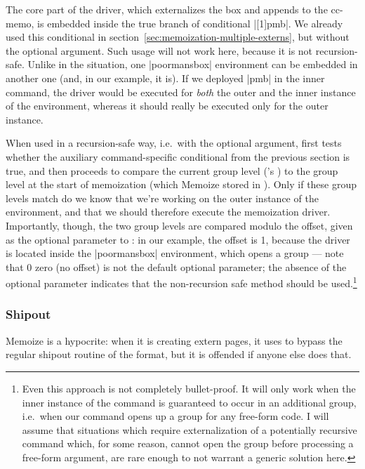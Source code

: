 \documentclass[a4paper,11pt]{article}
\begin{document}
The core part of the driver, which externalizes the box and appends to the
cc-memo, is embedded inside the true branch of conditional
|[1]{pmb}|.  We already used this conditional in
section~\ref{sec:memoization-multiple-externs}, but without the optional
argument.  Such usage will not work here, because it is not recursion-safe.
Unlike in the  situation, one |poormansbox| environment can be
embedded in another one (and, in our example, it is).  If we deployed
|{pmb}| in the inner command, the driver would be executed for
\emph{both} the outer and the inner instance of the environment, whereas it
should really be executed only for the outer instance.

When used in a recursion-safe way, i.e.\ with the optional argument,
 first tests whether the auxiliary command-specific
conditional from the previous section is true, and then proceeds to compare the
current group level ('s ) to the group
level at the start of memoization (which Memoize stored in
).  Only if these group levels match do we know
that we're working on the outer instance of the environment, and that we should
therefore execute the memoization driver.  Importantly, though, the two group
levels are compared modulo the offset, given as the optional parameter to
: in our example, the offset is 1, because the driver is
located inside the |poormansbox| environment, which opens a group --- note that
0 zero (no offset) is not the default optional parameter; the absence of the
optional parameter indicates that the non-recursion safe method should be
used.\footnote{Even this approach is not completely bullet-proof.  It will only
  work when the inner instance of the command is guaranteed to occur in an
  additional group, i.e.\ when our command opens up a group for any free-form
  code.  I will assume that situations which require externalization of a
  potentially recursive command which, for some reason, cannot open the group
  before processing a free-form argument, are rare enough to not warrant a
  generic solution here.}


\FloatBarrier


\subsubsection{Shipout}

Memoize is a hypocrite: when it is creating extern pages, it uses
 to bypass the regular shipout routine of the
format, but it is offended if anyone else does that.
\end{document}
